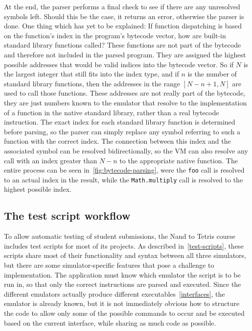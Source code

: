 At the end, the parser performs a final check to see if there are any unresolved symbols left.
Should this be the case, it returns an error, otherwise the parser is done.
One thing which has yet to be explained: If function dispatching is based on the function's index in the program's bytecode vector, how are built-in standard library functions called?
These functions are not part of the bytecode and therefore not included in the parsed program.
They are assigned the highest possible addresses that would be valid indices into the bytecode vector.
So if \(N\) is the largest integer that still fits into the index type, and if \(n\) is the number of standard library functions, then the addresses in the range \([N - n + 1, N]\) are used to call those functions.
These addresses are not really part of the bytecode, they are just numbers known to the emulator that resolve to the implementation of a function in the native standard library, rather than a real bytecode instruction.
The exact index for each standard library function is determined before parsing, so the parser can simply replace any symbol referring to such a function with the correct index.
The connection between this index and the associated symbol can be resolved bidirectionally, so the VM can also resolve any call with an index greater than \(N - n\) to the appropriate native function.
The entire process can be seen in~\cref{fig:bytecode-parsing}, were the \verb+foo+ call is resolved to an actual index in the result, while the \verb+Math.multiply+ call is resolved to the highest possible index.

\subsection{The test script workflow} \label{test-script-workflow}
To allow automatic testing of student submissions, the Nand to Tetris course includes test scripts for most of its projects.
As described in~\cref{test-scripts}, these scripts share most of their functionality and syntax between all three simulators, but there are some simulator-specific features that pose a challenge to implementation.
The application must know which emulator the script is to be run in, so that only the correct instructions are parsed and executed.
Since the different emulators actually produce different executables~\ref{interfaces}, the emulator is already known, but it is not immediately obvious how to structure the code to allow only some of the possible commands to occur and be executed based on the current interface, while sharing as much code as possible.

